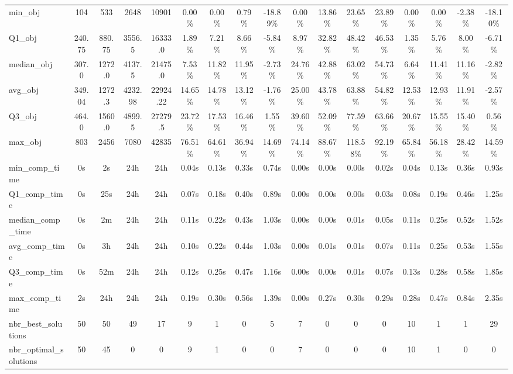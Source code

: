 \begin{tabular}{lcccccccccccccccc}
min_obj & 104 & 533 & 2648 & 10901 & 0.00\% & 0.00\% & 0.79\% & -18.89\% & 0.00\% & 13.86\% & 23.65\% & 23.89\% & 0.00\% & 0.00\% & -2.38\% & -18.10\% \\
Q1_obj & 240.75 & 880.75 & 3556.5 & 16333.0 & 1.89\% & 7.21\% & 8.66\% & -5.84\% & 8.97\% & 32.82\% & 48.42\% & 46.53\% & 1.35\% & 5.76\% & 8.00\% & -6.71\% \\
median_obj & 307.0 & 1272.0 & 4137.5 & 21475.0 & 7.53\% & 11.82\% & 11.95\% & -2.73\% & 24.76\% & 42.88\% & 63.02\% & 54.73\% & 6.64\% & 11.41\% & 11.16\% & -2.82\% \\
avg_obj & 349.04 & 1272.3 & 4232.98 & 22924.22 & 14.65\% & 14.78\% & 13.12\% & -1.76\% & 25.00\% & 43.78\% & 63.88\% & 54.82\% & 12.53\% & 12.93\% & 11.91\% & -2.57\% \\
Q3_obj & 464.0 & 1560.0 & 4899.5 & 27279.5 & 23.72\% & 17.53\% & 16.46\% & 1.55\% & 39.60\% & 52.09\% & 77.59\% & 63.66\% & 20.67\% & 15.55\% & 15.40\% & 0.56\% \\
max_obj & 803 & 2456 & 7080 & 42835 & 76.51\% & 64.61\% & 36.94\% & 14.69\% & 74.14\% & 88.67\% & 118.58\% & 92.19\% & 65.84\% & 56.18\% & 28.42\% & 14.59\% \\
min_comp_time & 0s & 2s & 24h & 24h & 0.04s & 0.13s & 0.33s & 0.74s & 0.00s & 0.00s & 0.00s & 0.02s & 0.04s & 0.13s & 0.36s & 0.93s \\
Q1_comp_time & 0s & 25s & 24h & 24h & 0.07s & 0.18s & 0.40s & 0.89s & 0.00s & 0.00s & 0.00s & 0.03s & 0.08s & 0.19s & 0.46s & 1.25s \\
median_comp_time & 0s & 2m & 24h & 24h & 0.11s & 0.22s & 0.43s & 1.03s & 0.00s & 0.00s & 0.01s & 0.05s & 0.11s & 0.25s & 0.52s & 1.52s \\
avg_comp_time & 0s & 3h & 24h & 24h & 0.10s & 0.22s & 0.44s & 1.03s & 0.00s & 0.01s & 0.01s & 0.07s & 0.11s & 0.25s & 0.53s & 1.55s \\
Q3_comp_time & 0s & 52m & 24h & 24h & 0.12s & 0.25s & 0.47s & 1.16s & 0.00s & 0.00s & 0.01s & 0.07s & 0.13s & 0.28s & 0.58s & 1.85s \\
max_comp_time & 2s & 24h & 24h & 24h & 0.19s & 0.30s & 0.56s & 1.39s & 0.00s & 0.27s & 0.30s & 0.29s & 0.28s & 0.47s & 0.84s & 2.35s \\
nbr_best_solutions & 50 & 50 & 49 & 17 & 9 & 1 & 0 & 5 & 7 & 0 & 0 & 0 & 10 & 1 & 1 & 29 \\
nbr_optimal_solutions & 50 & 45 & 0 & 0 & 9 & 1 & 0 & 0 & 7 & 0 & 0 & 0 & 10 & 1 & 0 & 0 \\
\bottomrule
\end{tabular}

